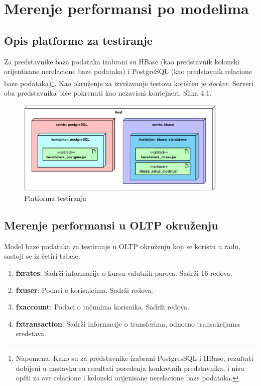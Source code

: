 \documentclass[12pt,oneside]{memoir}
\begin{document}
\chapter{Merenje performansi po modelima}

\section{Opis platforme za testiranje}

Za predstavnike baza podataka izabrani su HBase (kao predstavnik kolonski orijentisane nerelacione baze podataka) i PostgreSQL (kao predstavnik relacione baze podataka)\footnote{Napomena: Kako su za predstavnike izabrani PostgresSQL i HBase, rezultati dobijeni u nastavku su rezultati poređenja konkretnih predstavnika, i nisu opšti za sve relacione i kolonski orijenisane nerelacione baze podataka.}.  Kao okruženje za izvršavanje testova  korišćen je \textit{docker}. Serveri oba predstavnika biće pokrenuti kao nezavisni kontejneri, Slika 4.1. 

\begin{figure}[!ht]
  \centering
  \includegraphics[width=0.9\textwidth]{deployment_diagram.png}
  \caption{Platforma testiranja}
  \label{fig:grafikon}
\end{figure}


\section{Merenje performansi u OLTP okruženju}

Model baze podataka za testiranje u OLTP okruženju koji se koristu u radu, sastoji se iz četiri tabele:


\begin{enumerate}
\item[\textbullet] \textbf{fxrates}: {
	Sadrži informacije o kursu valutnih parova. Sadrži 16 redova.
}
\item[\textbullet] \textbf{fxuser}:{
	Podaci o korisnicima. Sadrži   redova.
}
\item[\textbullet] \textbf{fxaccount}:{
	Podaci o računima korisnika. Sadrži   redova.
}
\item[\textbullet] \textbf{fxtransaction}:{
	Sadrži informacije o transferima, odnosno transakcijama sredstava.
}
\end{enumerate}
\end{document}
